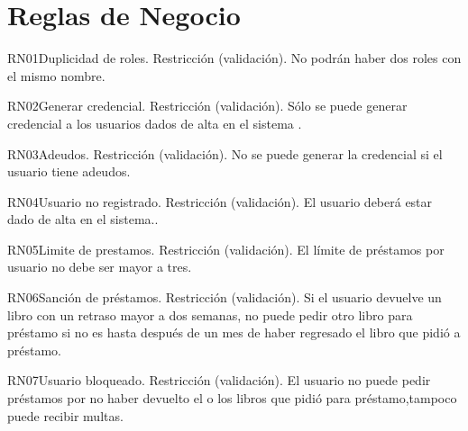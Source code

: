 \section{Reglas de Negocio}

\begin{BussinesRule}{RN01}{Duplicidad de roles.} 
	\BRitem[Tipo:] Restricción (validación).
	\BRitem[Descripción:]No podrán haber dos roles con el mismo nombre.
\end{BussinesRule}

\begin{BussinesRule}{RN02}{Generar credencial.} 
	\BRitem[Tipo:] Restricción (validación).
	\BRitem[Descripción:]Sólo se puede generar credencial a los usuarios dados de alta en el sistema
.
\end{BussinesRule}

\begin{BussinesRule}{RN03}{Adeudos.} 
	\BRitem[Tipo:] Restricción (validación).
	\BRitem[Descripción:]No se puede generar la credencial si el usuario tiene adeudos.
\end{BussinesRule}


\begin{BussinesRule}{RN04}{Usuario no registrado.} 
	\BRitem[Tipo:] Restricción (validación).
	\BRitem[Descripción:] El usuario deberá estar dado de alta en el sistema..
\end{BussinesRule}


\begin{BussinesRule}{RN05}{Limite de prestamos.} 
	\BRitem[Tipo:] Restricción (validación).
	\BRitem[Descripción:]El límite de préstamos por usuario no debe ser mayor a tres.
\end{BussinesRule}


\begin{BussinesRule}{RN06}{Sanción de préstamos.} 
	\BRitem[Tipo:] Restricción (validación).
	\BRitem[Descripción:]Si el usuario devuelve un libro con un retraso mayor a dos semanas, no puede pedir otro libro para préstamo si no es hasta después de un mes de haber regresado el libro que pidió a préstamo.
\end{BussinesRule}


\begin{BussinesRule}{RN07}{Usuario bloqueado.} 
	\BRitem[Tipo:] Restricción (validación).
	\BRitem[Descripción:]El usuario no puede pedir préstamos por no haber devuelto el o los libros que pidió para préstamo,tampoco puede recibir multas.
\end{BussinesRule}


